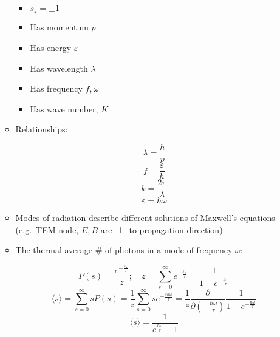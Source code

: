 \begin{itemize}
\begin{itemize}
\begin{itemize}
          \item $s_z=\pm1$

          \item Has momentum $p$

          \item Has energy $\varepsilon$

          \item Has wavelength $\lambda$

          \item Has frequency $f,\omega$

          \item Has wave number, $K$

        \end{itemize}

      \item Relationships:

        $$\lambda=\frac{h}{p}$$
        $$f=\frac{\varepsilon}{h}$$
        $$k=\frac{2\pi}{\lambda}$$
        $$\boxed{\varepsilon=\hbar\omega}$$

      \item Modes of radiation describe different solutions of Maxwell's equations (e.g.\ TEM node, $E,B$ are $\perp$ to propagation direction)

      \item The thermal average \# of photons in a mode of frequency $\omega$:

        $$P(s)=\frac{e^{-\frac{\varepsilon_s}{\tau}}}{z};\quad z=\sum_{s=0}^\infty e^{-\frac{\varepsilon_s}{\tau}}=\frac{1}{1-e^{-\frac{\hbar\omega}{\tau}}}$$
        $$\langle s\rangle=\sum_{s=0}^\infty sP(s)=\frac{1}{z}\sum_{s=0}^\infty se^{-\frac{s\hbar\omega}{\tau}}=\frac{1}{z}\frac{\partial}{\partial\left( -\frac{\hbar\omega}{\tau} \right)}\frac{1}{1-e^{-\frac{\hbar\omega}{\tau}}}$$
        $$\langle s\rangle=\frac{1}{e^{\frac{\hbar\omega}{\tau}}-1}$$

    \end{itemize}

\end{itemize}



